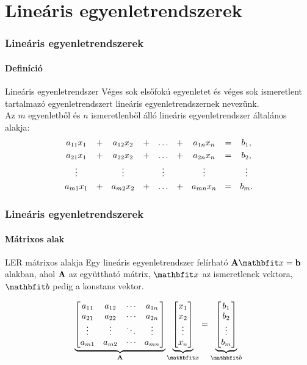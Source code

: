 \section{Lineáris egyenletrendszerek}
\begin{frame}
  \frametitle{Lineáris egyenletrendszerek}
  \framesubtitle{Definíció}

  \begin{block}{Lineáris egyenletrendszer}
    Véges sok elsőfokú egyenletet és véges sok ismeretlent tartalmazó
    egyenletrendszert lineáris egyenletrendszernek nevezünk.
    \\[2mm]
    Az $m$ egyenletből és $n$ ismeretlenből álló lineáris egyenletrendszer
    általános alakja:
    \[
      \begin{array}{*{9}{c}}
        a_{11} x_{1} & + & a_{12} x_{2} & + & \dots  & + & a_{1n} x_{n} & = & b_{1}\text, \\[1mm]
        a_{21} x_{1} & + & a_{22} x_{2} & + & \dots  & + & a_{2n} x_{n} & = & b_{2}\text, \\[1mm]
        \vdots       &   & \vdots       &   & \vdots &   & \vdots       &   & \vdots      \\[1mm]
        a_{m1} x_{1} & + & a_{m2} x_{2} & + & \dots  & + & a_{mn} x_{n} & = & b_{m}\text.
      \end{array}
    \]
  \end{block}
\end{frame}

\begin{frame}
  \frametitle{Lineáris egyenletrendszerek}
  \framesubtitle{Mátrixos alak}

  \begin{block}{LER mátrixos alakja}
    Egy lineáris egyenletrendszer felírható $\rmat A \rvec x = \rmat b$
    alakban, ahol $\mathbf{A}$ az együttható mátrix, $\rvec x$ az ismeretlenek
    vektora, $\rvec b$ pedig a konstans vektor.

    \[
      \underbrace{\begin{bmatrix}
          a_{11} & a_{12} & \cdots & a_{1n} \\
          a_{21} & a_{22} & \cdots & a_{2n} \\
          \vdots & \vdots & \ddots & \vdots \\
          a_{m1} & a_{m2} & \cdots & a_{mn}
        \end{bmatrix}}_{\rmat A} \underbrace{\begin{bmatrix}
          x_{1} \\ x_{2} \\ \vdots \\ x_{n}
        \end{bmatrix}}_{\rvec x} = \underbrace{\begin{bmatrix}
          b_{1} \\ b_{2} \\ \vdots \\ b_{m}
        \end{bmatrix}}_{\rvec b}
    \]
  \end{block}
\end{frame}

